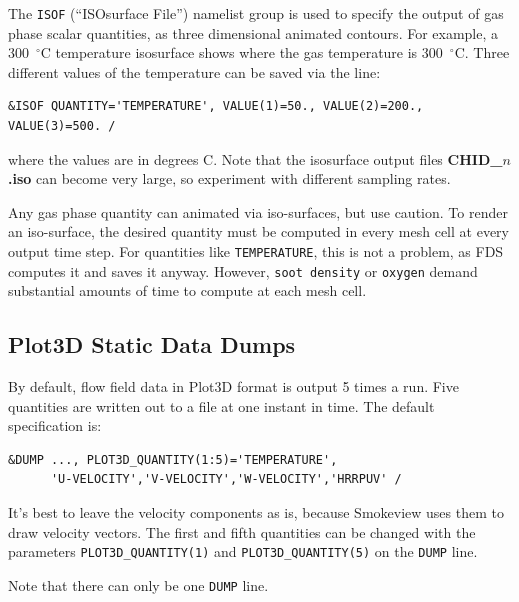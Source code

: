 \documentclass[11pt]{book}
\newcommand{\ct}{\tt\small}
\begin{document}
The {\ct ISOF} (``ISOsurface File'') namelist group is used to specify the output of
gas phase scalar quantities, as three dimensional animated contours.
For example, a 300~$^\circ$C temperature isosurface shows where the gas temperature is
300~$^\circ$C.
Three different values of the temperature can be saved via the line:

\footnotesize
\begin{verbatim}
&ISOF QUANTITY='TEMPERATURE', VALUE(1)=50., VALUE(2)=200., VALUE(3)=500. /
\end{verbatim}
\normalsize

\noindent
where the values are in degrees C. Note that the isosurface output
files {\bf CHID\_$n$.iso} can become very large, so experiment with different sampling rates.

Any gas phase quantity can animated via iso-surfaces, but use caution. To render an iso-surface, the desired quantity must be
computed in every mesh cell at every output time step. For quantities like {\ct TEMPERATURE}, this is not a problem, as FDS computes it and saves it
anyway. However, {\ct soot density} or {\ct oxygen} demand substantial amounts of time to compute at each mesh cell.




\subsection{Plot3D Static Data Dumps}
\label{info:PL3D}

By default, flow field data in Plot3D format is output 5 times a run.
Five quantities are written out to a file at one instant in time. The default specification is:

\footnotesize
\begin{verbatim}
&DUMP ..., PLOT3D_QUANTITY(1:5)='TEMPERATURE',
      'U-VELOCITY','V-VELOCITY','W-VELOCITY','HRRPUV' /
\end{verbatim}
\normalsize

\noindent
It's best to leave the velocity components as is, because Smokeview
uses them to draw velocity vectors. The first and fifth quantities can
be changed with the parameters {\ct PLOT3D\_QUANTITY(1)} and {\ct PLOT3D\_QUANTITY(5)}
on the {\ct DUMP} line.

\begin{warning}
Note that there can only be one {\ct DUMP} line.
\end{warning}
\end{document}
